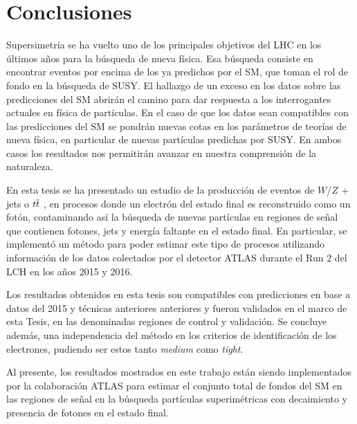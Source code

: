 \chapter{Conclusiones}

Supersimetría se ha vuelto uno de los principales objetivos del LHC en los últimos años para la búsqueda de nueva física. Esa búsqueda consiste en encontrar eventos por encima de los ya predichos por el SM, que toman el rol de fondo en la búsqueda de SUSY. El hallazgo de un exceso en los datos sobre las predicciones del SM abrirán el camino para dar respuesta a los interrogantes actuales en física de partículas. En el caso de que los datos sean compatibles con las predicciones del SM se pondrán nuevas cotas en los parámetros de teorías de nueva física, en particular de nuevas partículas predichas por SUSY. En ambos casos los resultados nos permitirán avanzar en nuestra comprensión de la naturaleza. 

En esta tesis se ha presentado un estudio de la producción de eventos de $W$/$Z$ + jets o $t \overline{t}$ , en procesos donde un electrón del estado final es reconstruido como un fotón, contaminando así la búsqueda de nuevas partículas en regiones de señal que contienen fotones, jets y energía faltante en el estado final. En particular, se implementó un método para poder estimar este tipo de procesos utilizando información de los datos colectados por el detector ATLAS durante el Run 2 del LCH en los años 2015 y 2016.

Los resultados obtenidos en esta tesis son compatibles con predicciones en base a datos del 2015 y técnicas anteriores anteriores \cite{Alonso:2147473} \cite{Schumm:1994343} \cite{Collaboration:2198651} y fueron validados en el marco de esta Tesis, en las denominadas regiones de control y validación. Se concluye además, una independencia del método en los criterios de identificación de los electrones, pudiendo ser estos tanto \textit{medium} como \textit{tight}.

Al presente, los resultados mostrados en este trabajo están siendo implementados por la colaboración ATLAS para estimar el conjunto total de fondos del SM en las regiones de señal en la búsqueda partículas superimétricas con decaimiento y presencia de fotones en el estado final.
